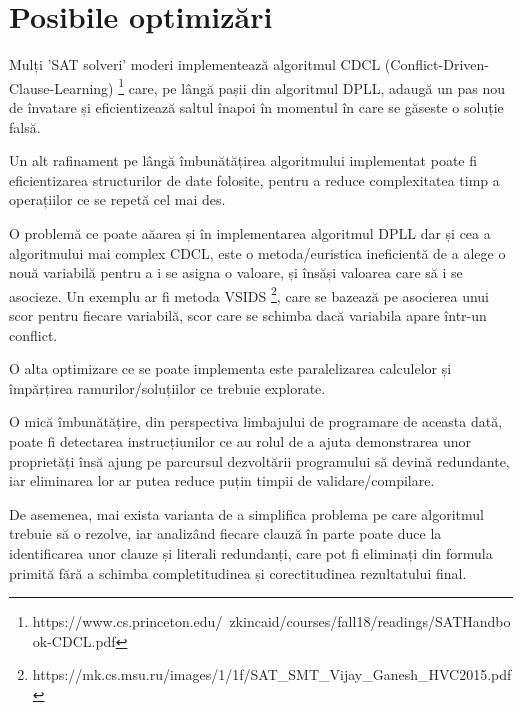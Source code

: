 \section{Posibile optimizări}

Mulți 'SAT solveri' moderi implementează algoritmul CDCL (Conflict-Driven-Clause-Learning) \footnote{https://www.cs.princeton.edu/~zkincaid/courses/fall18/readings/SATHandbook-CDCL.pdf}
 care, pe lângă pașii din algoritmul DPLL, adaugă un pas nou de învatare și eficientizează saltul înapoi în momentul în care se găseste o soluție falsă.

Un alt rafinament pe lângă îmbunătățirea algoritmului implementat poate fi eficientizarea structurilor de date folosite, pentru a reduce complexitatea timp a operațiilor ce se repetă cel mai des.

O problemă ce poate aăarea și în implementarea algoritmul DPLL dar și cea a algoritmului mai complex CDCL, este o metoda/euristica ineficientă de a alege o nouă variabilă pentru a i se asigna o valoare, și însăși valoarea care să i se asocieze. Un exemplu ar fi metoda VSIDS 
\footnote{https://mk.cs.msu.ru/images/1/1f/SAT\_SMT\_Vijay\_Ganesh\_HVC2015.pdf}, care se bazează pe asocierea unui scor pentru fiecare variabilă, scor care se schimba dacă variabila apare într-un conflict. 

O alta optimizare ce se poate implementa este paralelizarea calculelor și împărțirea ramurilor/soluțiilor ce trebuie explorate.

O mică îmbunătățire, din perspectiva limbajului de programare de aceasta dată, poate fi detectarea instrucțiunilor ce au rolul de a ajuta demonstrarea unor proprietăți însă ajung pe parcursul dezvoltării programului să devină redundante, iar eliminarea lor ar putea reduce puțin timpii de validare/compilare.

De asemenea, mai exista varianta de a simplifica problema pe care algoritmul trebuie să o rezolve, iar analizând fiecare clauză în parte poate duce la identificarea unor clauze și literali redundanți, care pot fi eliminați din formula primită fără a schimba completitudinea și corectitudinea rezultatului final.